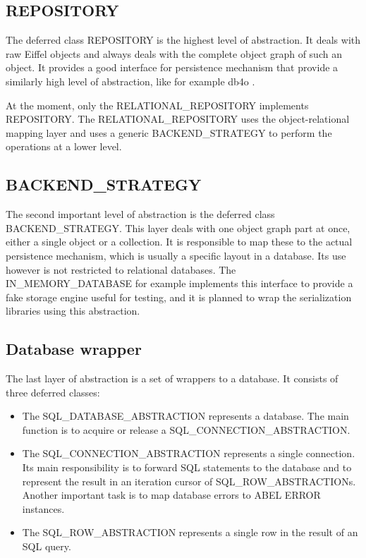 \subsection{REPOSITORY}

The deferred class REPOSITORY is the highest level of abstraction.
It deals with raw Eiffel objects and always deals with the complete object graph of such an object.
It provides a good interface for persistence mechanism that provide a similarly high level of abstraction, like for example db4o .

At the moment, only the RELATIONAL\_REPOSITORY implements REPOSITORY.
The RELATIONAL\_REPOSITORY uses the object-relational mapping layer and uses a generic BACKEND\_STRATEGY to perform the operations at a lower level.

\subsection{BACKEND\_STRATEGY}

The second important level of abstraction is the deferred class BACKEND\_STRATEGY.
This layer deals with one object graph part at once, either a single object or a collection.
It is responsible to map these to the actual persistence mechanism, which is usually a specific layout in a database.
Its use however is not restricted to relational databases.
The IN\_MEMORY\_DATABASE for example implements this interface to provide a fake storage engine useful for testing, and it is planned to wrap the serialization libraries using this abstraction.

\subsection{Database wrapper}


The last layer of abstraction is a set of wrappers to a database. 
It consists of three deferred classes: 
\begin{itemize}
 \item The SQL\_DATABASE\_ABSTRACTION represents a database. The main function is to acquire or release a SQL\_CONNECTION\_ABSTRACTION.
 \item The SQL\_CONNECTION\_ABSTRACTION represents a single connection. 
Its main responsibility is to forward SQL statements to the database and to represent the result in an iteration cursor of SQL\_ROW\_ABSTRACTIONs.
Another important task is to map database errors to ABEL ERROR instances.
  \item The SQL\_ROW\_ABSTRACTION represents a single row in the result of an SQL query.
\end{itemize}

